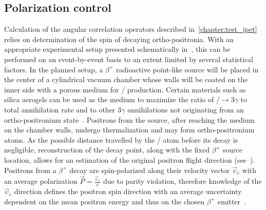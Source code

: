 \subsection{Polarization control}\label{sec:ops_polarization}
Calculation of the angular correlation operators described in~\cref{chapter:test_jpet} relies on determination of the spin of decaying ortho-positronia. With an appropriate experimental setup presented schematically in~, this can be performed on an event-by-event basis to an extent limited by several statistical factors. In the planned setup, a $\beta^+$ radioactive point-like source will be placed in the center of a cylindrical vacuum chamber whose walls will be coated on the inner side with a porous medium for \ops/ production. Certain materials such as silica aerogels can be used as the medium to maximize the ratio of \ops/$\to 3\gamma$ to total annihilation rate and to other $3\gamma$ annihilations not originating from an ortho-positronium state~\cite{Jasinska:2016qsf,moskal_potential}. Positrons from the source, after reaching the medium on the chamber walls, undergo thermalization and may form ortho-positronium atoms. As the possible distance travelled by the \ops/ atom before its decay is negligible, reconstruction of the decay point, along with the fixed $\beta^+$ source location, allows for an estimation of the original positron flight direction (see~). Positrons from a $\beta^+$ decay are spin-polarized along their velocity vector $\vec{\upsilon}_e$ with an average polarization $\vec{P}=\frac{\vec{\upsilon}_e}{c}$ due to parity violation, therefore knowledge of the $\vec{\upsilon}_e$ direction defines the positron spin direction with an average uncertainty dependent on the mean positron energy and thus on the chosen $\beta^+$ emitter~\cite{moskal_potential}.

